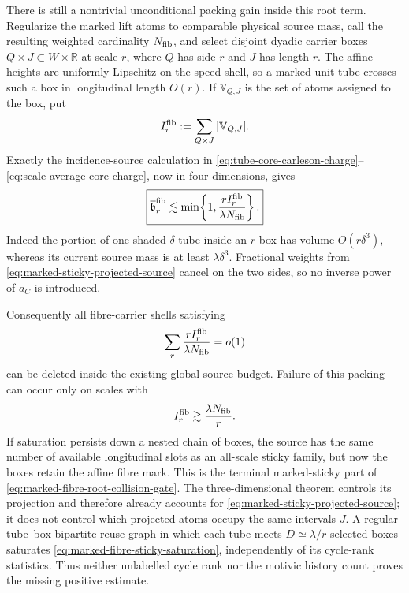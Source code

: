 \documentclass[11pt]{article}
\begin{document}
There is still a nontrivial unconditional packing gain inside this root term.
Regularize the marked lift atoms to comparable physical source mass, call the
resulting weighted cardinality \(N_{\rm fib}\), and select disjoint dyadic
carrier boxes \(Q\times J\subset W\times\mathbb R\) at scale
\(r\), where \(Q\) has side \(r\) and \(J\) has length \(r\).
The affine heights are uniformly Lipschitz on the speed shell, so a marked
unit tube crosses such a box in longitudinal length \(O(r)\).  If
\(\mathbb V_{Q,J}\) is the set of atoms assigned to the box, put
\begin{equation}\label{eq:marked-fibre-carrier-incidence}
 I_r^{\rm fib}
 :=\sum_{Q\times J}|\mathbb V_{Q,J}|.
\end{equation}
Exactly the incidence-source calculation in
\eqref{eq:tube-core-carleson-charge}--%
\eqref{eq:scale-average-core-charge}, now in four dimensions, gives
\begin{equation}\label{eq:marked-fibre-average-carrier-charge}
 \boxed{
 \overline{\mathfrak b}_{r}^{\rm fib}
 \lesssim
 \min\!\left\{1,
   \frac{rI_r^{\rm fib}}{\lambda N_{\rm fib}}\right\}.}
\end{equation}
Indeed the portion of one shaded \(\delta\)-tube inside an
\(r\)-box has volume \(O(r\delta^3)\), whereas its current source mass
is at least \(\lambda\delta^3\).  Fractional weights from
\eqref{eq:marked-sticky-projected-source} cancel on the two sides, so no
inverse power of \(a_C\) is introduced.

Consequently all fibre-carrier shells satisfying
\begin{equation}\label{eq:marked-fibre-nonsaturated-shells}
 \sum_r\frac{rI_r^{\rm fib}}
                   {\lambda N_{\rm fib}}=o(1)
\end{equation}
can be deleted inside the existing global source budget.  Failure of this
packing can occur only on scales with
\begin{equation}\label{eq:marked-fibre-sticky-saturation}
 I_r^{\rm fib}
 \gtrsim\frac{\lambda N_{\rm fib}}r .
\end{equation}
If saturation persists down a nested chain of boxes, the source has the same
number of available longitudinal slots as an all-scale sticky family, but now
the boxes retain the affine fibre mark.  This is the terminal marked-sticky
part of \eqref{eq:marked-fibre-root-collision-gate}.  The
three-dimensional theorem controls its projection and therefore already
accounts for \eqref{eq:marked-sticky-projected-source}; it does not control
which projected atoms occupy the same intervals \(J\).  A regular
tube--box bipartite reuse graph in which each tube meets
\(D\simeq\lambda/r\) selected boxes saturates
\eqref{eq:marked-fibre-sticky-saturation}, independently of its cycle-rank
statistics.  Thus neither unlabelled cycle rank nor the motivic history count
proves the missing positive estimate.
\end{document}
